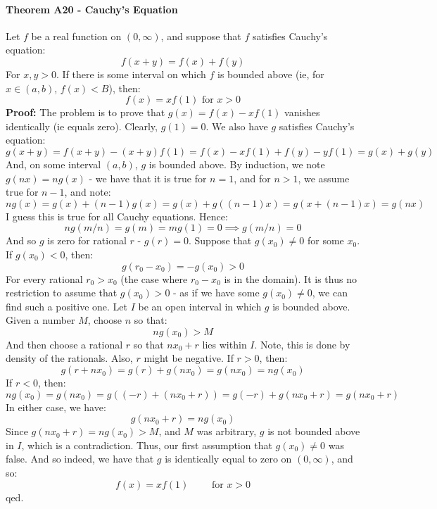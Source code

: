 \documentclass[12pt,a4paper]{article}
\newcommand{\1}[1]{\mathbbm{1}\left\{ #1 \right\}}
\begin{document}
\paragraph{Theorem A20 - Cauchy's Equation} Let $f$ be a real function on $(0,\infty)$, and suppose that $f$ satisfies Cauchy's equation:
$$
	f(x + y) = f(x) + f(y)
$$
For $x,y > 0$. If there is some interval on which $f$ is bounded above (ie, for $x \in (a,b)$, $f(x) < B$), then:
$$
	f(x) = xf(1) \text{ for $x > 0$}
$$
\textbf{Proof:} The problem is to prove that $g(x) = f(x) - xf(1)$ vanishes identically (ie equals zero). Clearly, $g(1) = 0$. We also have $g$ satisfies Cauchy's equation:
$$
	g(x + y) = f(x + y) - (x + y)f(1) = f(x) - xf(1) + f(y) - yf(1) = g(x) + g(y)
$$
And, on some interval $(a,b)$, $g$ is bounded above. By induction, we note $g(nx) = ng(x)$ - we have that it is true for $n = 1$, and for $n > 1$, we assume true for $n-1$, and note:
$$
	ng(x) = g(x) + (n-1)g(x) = g(x) + g((n-1)x) = g(x + (n-1)x) = g(nx)
$$
I guess this is true for all Cauchy equations. Hence:
$$
	ng(m/n) = g(m) = mg(1) = 0 \implies g(m/n) = 0
$$
And so $g$ is zero for rational $r$ - $g(r) = 0$. Suppose that $g(x_0) \neq 0$ for some $x_0$. If $g(x_0) < 0$, then:
$$
	g(r_0 - x_0) = -g(x_0) > 0
$$
For every rational $r_0 > x_0$ (the case where $r_0 - x_0$ is in the domain). It is thus no restriction to assume that $g(x_0) > 0$ - as if we have some $g(x_0) \neq 0$, we can find such a positive one. Let $I$ be an open interval in which $g$ is bounded above. Given a number $M$, choose $n$ so that:
$$
	ng(x_0) > M
$$
And then choose a rational $r$ so that $nx_0 + r$ lies within $I$. Note, this is done by density of the rationals. Also, $r$ might be negative. If $r > 0$, then:
$$
	g(r + nx_0) = g(r) + g(nx_0) = g(nx_0) = ng(x_0)
$$
If $r < 0$, then:
$$
	ng(x_0) = g(nx_0) = g((-r) + (nx_0 + r)) = g(-r) + g(nx_0 + r) = g(nx_0 + r)
$$
In either case, we have:
$$
	g(nx_0 + r) = ng(x_0)
$$
Since $g(nx_0 + r) = ng(x_0) > M$, and $M$ was arbitrary, $g$ is not bounded above in $I$, which is a contradiction. Thus, our first assumption that $g(x_0) \neq 0$ was false. And so indeed, we have that $g$ is identically equal to zero on $(0,\infty)$, and so:
$$
	f(x) = xf(1) \quad\quad \text{ for $x > 0$}
$$
qed.
\end{document}
